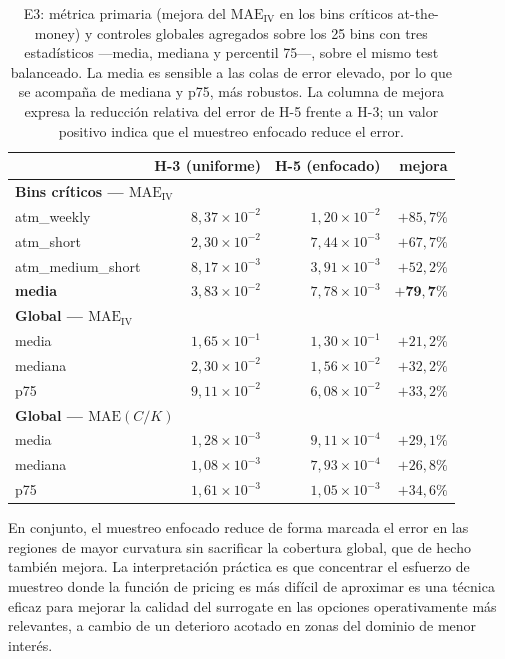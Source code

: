 \documentclass[11pt,a4paper]{article}
\begin{document}
\begin{table}[H]
\centering
\small
\renewcommand{\arraystretch}{1.15}
\begin{tabular}{l r r r}
\toprule
 & H-3 (uniforme) & H-5 (enfocado) & mejora \\
\midrule
\multicolumn{4}{l}{\textbf{Bins críticos --- $\text{MAE}_{\text{IV}}$}} \\
\quad atm\_weekly        & $8{,}37\times 10^{-2}$ & $1{,}20\times 10^{-2}$ & $+85{,}7\%$ \\
\quad atm\_short         & $2{,}30\times 10^{-2}$ & $7{,}44\times 10^{-3}$ & $+67{,}7\%$ \\
\quad atm\_medium\_short & $8{,}17\times 10^{-3}$ & $3{,}91\times 10^{-3}$ & $+52{,}2\%$ \\
\quad \textbf{media}     & $3{,}83\times 10^{-2}$ & $7{,}78\times 10^{-3}$ & $\mathbf{+79{,}7\%}$ \\
\midrule
\multicolumn{4}{l}{\textbf{Global --- $\text{MAE}_{\text{IV}}$}} \\
\quad media   & $1{,}65\times 10^{-1}$ & $1{,}30\times 10^{-1}$ & $+21{,}2\%$ \\
\quad mediana & $2{,}30\times 10^{-2}$ & $1{,}56\times 10^{-2}$ & $+32{,}2\%$ \\
\quad p75     & $9{,}11\times 10^{-2}$ & $6{,}08\times 10^{-2}$ & $+33{,}2\%$ \\
\midrule
\multicolumn{4}{l}{\textbf{Global --- $\text{MAE}(C/K)$}} \\
\quad media   & $1{,}28\times 10^{-3}$ & $9{,}11\times 10^{-4}$ & $+29{,}1\%$ \\
\quad mediana & $1{,}08\times 10^{-3}$ & $7{,}93\times 10^{-4}$ & $+26{,}8\%$ \\
\quad p75     & $1{,}61\times 10^{-3}$ & $1{,}05\times 10^{-3}$ & $+34{,}6\%$ \\
\bottomrule
\end{tabular}
\caption{E3: métrica primaria (mejora del $\text{MAE}_{\text{IV}}$ en los bins críticos at-the-money) y controles globales agregados sobre los 25 bins con tres estadísticos —media, mediana y percentil 75—, sobre el mismo test balanceado. La media es sensible a las colas de error elevado, por lo que se acompaña de mediana y p75, más robustos. La columna de mejora expresa la reducción relativa del error de H-5 frente a H-3; un valor positivo indica que el muestreo enfocado reduce el error.}
\label{tab:e3}
\end{table}

En conjunto, el muestreo enfocado reduce de forma marcada el error en las regiones de mayor curvatura sin sacrificar la cobertura global, que de hecho también mejora. La interpretación práctica es que concentrar el esfuerzo de muestreo donde la función de pricing es más difícil de aproximar es una técnica eficaz para mejorar la calidad del surrogate en las opciones operativamente más relevantes, a cambio de un deterioro acotado en zonas del dominio de menor interés.
\end{document}
